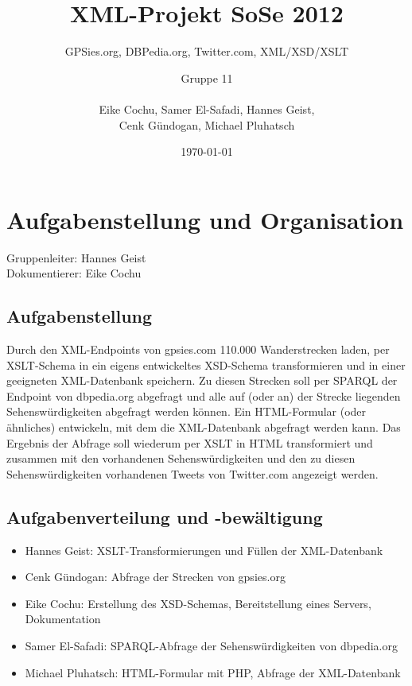 \documentclass[10pt,a4paper]{scrartcl}
\title{XML-Projekt SoSe 2012}
\subtitle{GPSies.org, DBPedia.org, Twitter.com, XML/XSD/XSLT\vspace*{.7cm}}
\author{Gruppe 11\\\hfill\\Eike Cochu, Samer El-Safadi, Hannes Geist,\\Cenk Gündogan, Michael Pluhatsch}
\date{\today}
\begin{document}
\maketitle
\thispagestyle{empty}
\vspace*{2cm}
\tableofcontents
\newpage
\renewcommand{\baselinestretch}{1.5}
\selectfont

\section{Aufgabenstellung und Organisation}
Gruppenleiter: Hannes Geist\\
Dokumentierer: Eike Cochu

\subsection{Aufgabenstellung}
Durch den XML-Endpoints von gpsies.com 110.000 Wanderstrecken laden, per XSLT-Schema in ein eigens entwickeltes XSD-Schema transformieren und in einer geeigneten XML-Datenbank speichern. Zu diesen Strecken soll per SPARQL der Endpoint von dbpedia.org abgefragt und alle auf (oder an) der Strecke liegenden Sehenswürdigkeiten abgefragt werden können. Ein HTML-Formular (oder ähnliches) entwickeln, mit dem die XML-Datenbank abgefragt werden kann. Das Ergebnis der Abfrage soll wiederum per XSLT in HTML transformiert und zusammen mit den vorhandenen Sehenswürdigkeiten und den zu diesen Sehenswürdigkeiten vorhandenen Tweets von Twitter.com angezeigt werden.

\subsection{Aufgabenverteilung und -bewältigung}
\begin{itemize}
\item Hannes Geist: XSLT-Transformierungen und Füllen der XML-Datenbank
\item Cenk Gündogan: Abfrage der Strecken von gpsies.org 
\item Eike Cochu: Erstellung des XSD-Schemas, Bereitstellung eines Servers, Dokumentation
\item Samer El-Safadi: SPARQL-Abfrage der Sehenswürdigkeiten von dbpedia.org
\item Michael Pluhatsch: HTML-Formular mit PHP, Abfrage der XML-Datenbank
\end{itemize}






\end{document}

